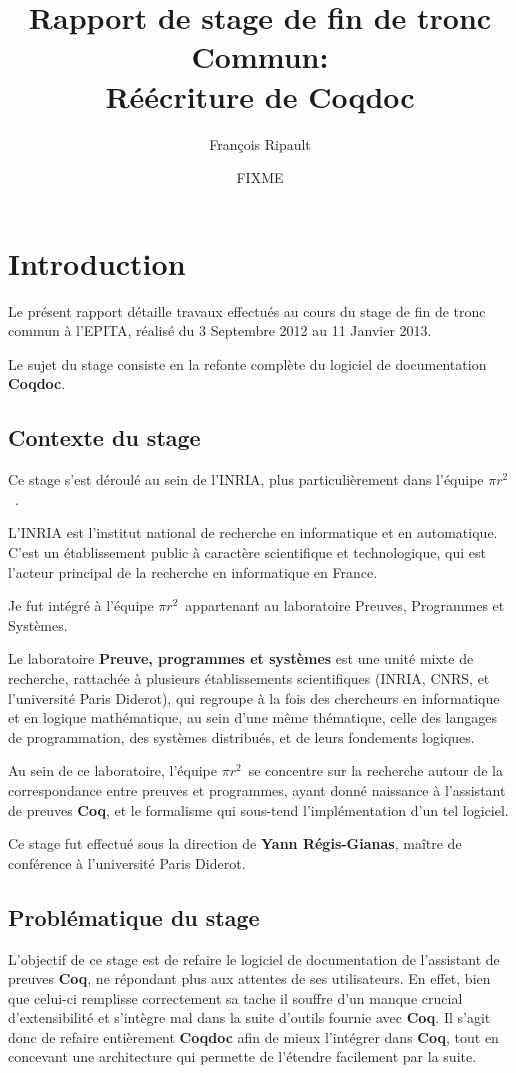 \documentclass[a4paper, 11pt]{report}
\title{Rapport de stage de fin de tronc Commun: \\
  Réécriture de Coqdoc}
\author{François Ripault}
\date{FIXME}
\newcommand{\pir}[0]{\textbf{$\pi r^2$}~}
\newcommand{\coq}[0]{\textbf{Coq}\xspace}
\newcommand{\coqdoc}[0]{\textbf{Coqdoc}\xspace}
\newcommand{\yrg}[0]{\xspace\textbf{Yann Régis-Gianas}\xspace}
\newcommand{\epita}[0]{EPITA}
\begin{document}
\maketitle
\thispagestyle{empty}

\tableofcontents
\thispagestyle{empty}

\setcounter{page}{0}
\chapter{Introduction}
  Le présent rapport détaille travaux effectués au cours du stage de fin
  de tronc commun à l'\epita, réalisé du 3 Septembre 2012 au 11 Janvier 2013.

  Le sujet du stage consiste en la refonte complète du logiciel de
  documentation \coqdoc.

  \section{Contexte du stage}
  Ce stage s'est déroulé au sein de l'INRIA, plus particulièrement dans
  l'équipe \pir.

  L'INRIA est l'institut national de recherche en informatique et en
  automatique. C'est un établissement public à caractère scientifique et
  technologique, qui est l'acteur principal de la recherche en informatique en
  France.

  Je fut intégré à l'équipe \pir appartenant au laboratoire Preuves, Programmes et
  Systèmes.

  Le laboratoire \textbf{Preuve, programmes et systèmes} est une unité mixte
  de recherche, rattachée à plusieurs établissements scientifiques (INRIA,
  CNRS, et l'université Paris Diderot), qui regroupe à la fois des
  chercheurs en informatique et en logique mathématique, au sein d'une même
  thématique, celle des langages de programmation, des systèmes distribués,
  et de leurs fondements logiques.

  Au sein de ce laboratoire, l'équipe \pir se concentre sur la recherche
  autour de la correspondance entre preuves et programmes, ayant donné
  naissance à l'assistant de preuves \coq, et le formalisme qui sous-tend
  l'implémentation d'un tel logiciel.

  Ce stage fut effectué sous la direction de \yrg, maître de conférence à
  l'université Paris Diderot.

  \section{Problématique du stage}
  L'objectif de ce stage est de refaire le logiciel de documentation de
  l'assistant de preuves \coq, ne répondant plus aux attentes de ses
  utilisateurs.
  En effet, bien que celui-ci remplisse correctement sa tache il souffre d'un
  manque crucial d'extensibilité et s'intègre mal dans la suite d'outils
  fournie avec \coq. Il s'agit donc de refaire entièrement \coqdoc{} afin de
  mieux l'intégrer dans \coq, tout en concevant une architecture qui permette
  de l'étendre facilement par la suite.
\end{document}
